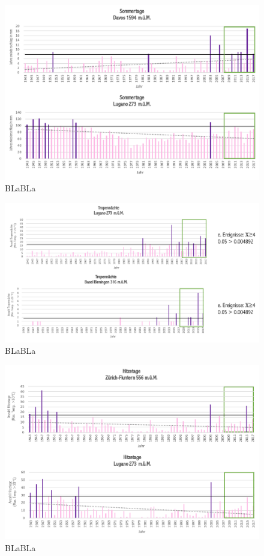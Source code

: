 \begin{refsection}
\begin{figure}[htbp]
\centering
\includegraphics[width=1.0\textwidth]{extrem/Sommertage.pdf}
\caption{BLaBLa}
\label{Sommertage}
\end{figure}




\begin{figure}[htbp]
\centering
\includegraphics[width=1.0\textwidth]{extrem/Tropennacht.pdf}
\caption{BLaBLa}
\label{Tropennacht}
\end{figure}



\begin{figure}[htbp]
\centering
\includegraphics[width=1.0\textwidth]{extrem/Hitzetage.pdf}
\caption{BLaBLa}
\label{Hitzetage}
\end{figure}



\end{refsection}
